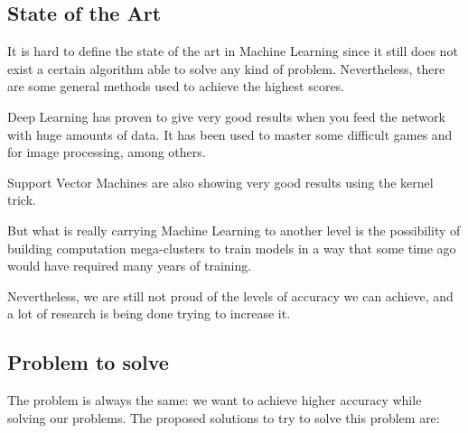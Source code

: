 \documentclass{article}
\begin{document}
    \subsection{State of the Art}

    It is hard to define the state of the art in Machine Learning since it still
    does not exist a certain algorithm able to solve any kind of problem.
    Nevertheless, there are some general methods used to achieve the highest
    scores.

    Deep Learning has proven to give very good results when you feed the network
    with huge amounts of data. It has been used to master some difficult games\cite{alphago16}
    and for image processing\cite{jiwan14}, among others.


    Support Vector Machines are also showing very good results using the
    kernel trick\cite{rahimi07}.

    But what is really carrying Machine Learning to another level is the possibility
    of building computation mega-clusters to train models in a way that some time
    ago would have required many years of training.

    Nevertheless, we are still not proud of the levels of accuracy we can achieve,
    and a lot of research is being done trying to increase it.

    \subsection{Problem to solve}
    The problem is always the same: we want to achieve higher accuracy while
    solving our problems. The proposed solutions to try to solve this problem
    are:
\end{document}
